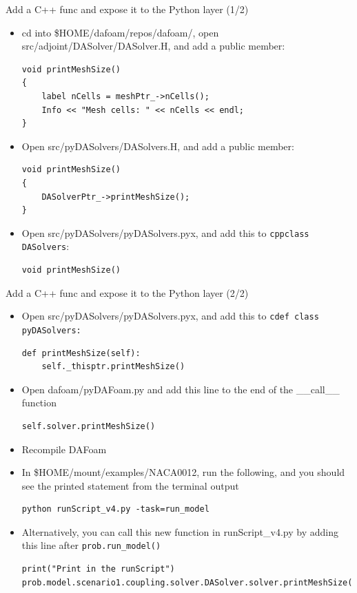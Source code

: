 \documentclass{bredelebeamer}
\begin{document}
\begin{frame}[fragile]{Add a C++ func and expose it to the Python layer (1/2)}

\begin{itemize}
  \item cd into \$HOME/dafoam/repos/dafoam/, open src/adjoint/DASolver/DASolver.H, and add a public member:
 \begin{lstlisting}
void printMeshSize() 
{
    label nCells = meshPtr_->nCells();
    Info << "Mesh cells: " << nCells << endl;
}
 \end{lstlisting}
  \item Open src/pyDASolvers/DASolvers.H, and add a public member:
 \begin{lstlisting}
void printMeshSize()
{
    DASolverPtr_->printMeshSize();
}
 \end{lstlisting}
  \item Open src/pyDASolvers/pyDASolvers.pyx, and add this to \texttt{cppclass DASolvers}:
 \begin{lstlisting}
void printMeshSize()
 \end{lstlisting}
\end{itemize}

\end{frame}

\begin{frame}[fragile]{Add a C++ func and expose it to the Python layer (2/2)}

\begin{itemize}
  \item Open src/pyDASolvers/pyDASolvers.pyx,  and add this to \texttt{cdef class pyDASolvers:}
 \begin{lstlisting}
def printMeshSize(self):
    self._thisptr.printMeshSize()
 \end{lstlisting}
 \item Open dafoam/pyDAFoam.py and add this line to the end of the \_\_call\_\_ function
  \begin{lstlisting}
self.solver.printMeshSize()
 \end{lstlisting}
 \item Recompile DAFoam
 \item In \$HOME/mount/examples/NACA0012, run the following, and you should see the printed statement from the terminal output
 \begin{lstlisting}
python runScript_v4.py -task=run_model
\end{lstlisting}
\item Alternatively, you can call this new function in runScript\_v4.py by adding this line after \texttt{prob.run\_model()}
 \begin{lstlisting}
print("Print in the runScript")
prob.model.scenario1.coupling.solver.DASolver.solver.printMeshSize()
\end{lstlisting}
\end{itemize}

\end{frame}
\end{document}
